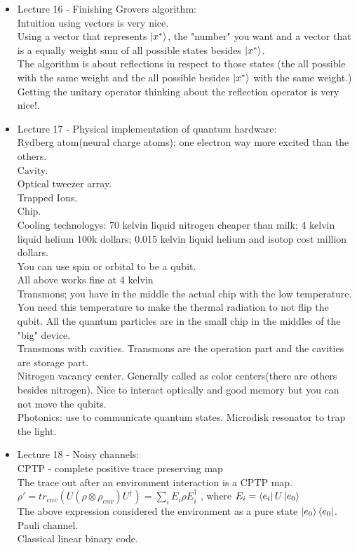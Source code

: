 \documentclass{article}
\begin{document}
\begin{itemize}
    \item {Lecture 16 - Finishing Grovers algorithm:}\\
    Intuition using vectors is very nice.\\
    Using a vector that represents $\ket{x^{*}}$, the "number" you want and a vector that is a equally weight sum of all possible states besides $\ket{x^{*}}$.\\
    The algorithm is about reflections in respect to those states (the all possible with the same weight and the all possible besides $\ket{x^{*}}$ with the same weight.)\\
    Getting the unitary operator thinking about the reflection operator is very nice!.\\
    
    \item {Lecture 17 - Physical implementation of quantum hardware:}\\
    Rydberg atom(neural charge atoms); one electron way more excited than the others.\\
    Cavity.\\
    Optical tweezer array.\\
    Trapped Ions.\\
    Chip.\\
    Cooling technologys: 70 kelvin liquid nitrogen cheaper than milk; 4 kelvin liquid helium 100k dollars; 0.015 kelvin liquid helium and isotop cost million dollars.\\
    You can use spin or orbital to be a qubit.\\
    All above works fine at 4 kelvin\\
    Transmons; you have in the middle the actual chip with the low temperature. You need this temperature to make the thermal radiation to not flip the qubit. All the quantum particles are in the small chip in the middles of the "big" device.\\
    Transmons with cavities. Transmons are the operation part and the cavities are storage part.\\
    Nitrogen vacancy center. Generally called as color centers(there are others besides nitrogen). Nice to interact optically and good memory but you can not move the qubits.\\
    Photonics: use to communicate quantum states. Microdisk resonator to trap the light.\\

    \item {Lecture 18 - Noisy channels:}\\
    CPTP - complete positive trace preserving map\\
    The trace out after an environment interaction is a CPTP map.\\
    $\rho ' = tr_{env}(U(\rho \otimes \rho_{env}) U^{\dag}) = \sum_i E_i \rho E_i^{\dag}$ , where $E_i = \bra{e_i} U \ket{e_0}$\\
    The above expression considered the environment as a pure state $\ket{e_0}\bra{e_0}$.\\
    Pauli channel.\\
    Classical linear binary code.\\  


\end{itemize}
\end{document}
